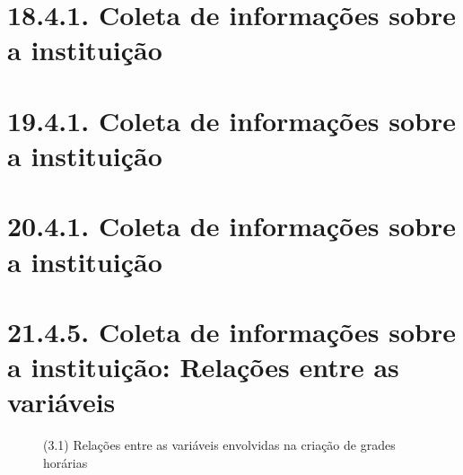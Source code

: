 






\chapter*{18.4.1. Coleta de informações sobre a instituição}
\chapter*{19.4.1. Coleta de informações sobre a instituição}
\chapter*{20.4.1. Coleta de informações sobre a instituição}
\chapter*{21.4.5. Coleta de informações sobre a instituição: Relações entre as variáveis}

\begin{figure}[htpb]\caption{(3.1) Relações entre as variáveis envolvidas na criação de grades horárias}\end{figure}

